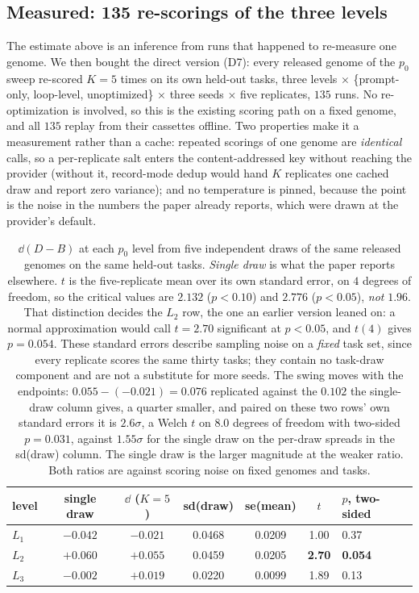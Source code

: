 \documentclass[11pt]{article}
\begin{document}
\subsection{Measured: 135 re-scorings of the three levels}
\label{sec:repeat}

The estimate above is an inference from runs that happened to re-measure one genome. We then
bought the direct version (D7): every released genome of the $p_0$ sweep re-scored $K=5$ times
on its own held-out tasks, three levels $\times$ \{prompt-only, loop-level, unoptimized\}
$\times$ three seeds $\times$ five replicates, $135$ runs. No re-optimization is involved, so
this is the existing scoring path on a fixed genome, and all $135$ replay from their cassettes
offline. Two properties make it a measurement rather than a cache: repeated scorings of one
genome are \emph{identical} calls, so a per-replicate salt enters the content-addressed key
without reaching the provider (without it, record-mode dedup would hand $K$ replicates one
cached draw and report zero variance); and no temperature is pinned, because the point is the
noise in the numbers the paper already reports, which were drawn at the provider's default.

\begin{table}[h]
\centering
\small
\begin{tabular}{lcccccl}
\toprule
level & single draw & $\dd$ ($K{=}5$) & sd(draw) & se(mean) & $t$ & $p$, two-sided \\
\midrule
$L_1$ & $-0.042$ & $-0.021$ & 0.0468 & 0.0209 & 1.00 & 0.37 \\
$L_2$ & $+0.060$ & $+0.055$ & 0.0459 & 0.0205 & \textbf{2.70} & \textbf{0.054} \\
$L_3$ & $-0.002$ & $+0.019$ & 0.0220 & 0.0099 & 1.89 & 0.13 \\
\bottomrule
\end{tabular}
\caption{$\dd(D-B)$ at each $p_0$ level from five independent draws of the same released
genomes on the same held-out tasks. \emph{Single draw} is what the paper reports elsewhere.
$t$ is the five-replicate mean over its own standard error, on $4$ degrees of freedom, so the
critical values are $2.132$ ($p<0.10$) and $2.776$ ($p<0.05$), \emph{not} $1.96$. That
distinction decides the $L_2$ row, the one an earlier version leaned on: a normal approximation
would call $t = 2.70$ significant at $p<0.05$, and $t(4)$ gives $p = 0.054$.
These standard errors describe sampling noise on a \emph{fixed} task set, since every replicate
scores the same thirty tasks; they contain no task-draw component and are not a substitute for
more seeds. The swing moves with the endpoints: $0.055 - (-0.021) = 0.076$ replicated against the
$0.102$ the single-draw column gives, a quarter smaller, and paired on these two rows' own
standard errors it is $2.6\sigma$, a Welch $t$ on $8.0$ degrees of freedom with two-sided
$p = 0.031$, against $1.55\sigma$ for the single draw on the per-draw spreads in the sd(draw)
column. The single draw is the larger magnitude at the weaker ratio. Both ratios
are against scoring noise on fixed genomes and tasks.}
\label{tab:repeat}
\end{table}
\end{document}
